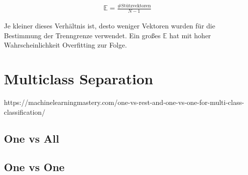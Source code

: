 \documentclass[a4paper,11pt,twoside]{scrreprt}
\begin{document}
\begin{equation}
	\begin{aligned}
		\mathbb{E} = \frac{\text{\#Stützvektoren}}{N-1}
	\end{aligned}
\end{equation}


Je kleiner dieses Verhältnis ist, desto weniger Vektoren wurden für die Bestimmung der Trenngrenze verwendet. Ein großes $\mathbb{E}$ hat mit hoher Wahrscheinlichkeit Overfitting zur Folge.


\chapter{Multiclass Separation}
https://machinelearningmastery.com/one-vs-rest-and-one-vs-one-for-multi-class-classification/
\section{One vs All}

\section{One vs One}




\nocite{*}

\clearpage
{}
{}
\printbibliography[title=Weiterführende Ressourcen]
\end{document}

